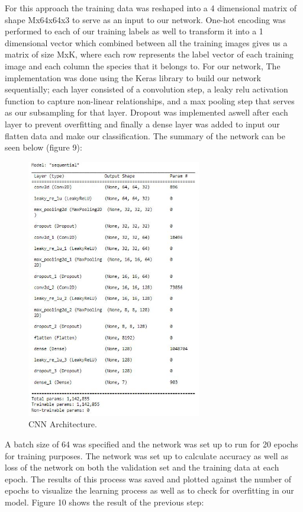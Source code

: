 \documentclass[11pt]{article}
\begin{document}
\begin{singlespace}
For this approach the training data was reshaped into a 4 dimensional matrix of shape Mx64x64x3 to serve as an input to our network. One-hot encoding was performed to each of our training labels as well to transform it into a 1 dimensional vector which combined between all the training images gives us a matrix of size MxK, where each row represents the label vector of each training image and each column the species that it belongs to. For our network, The implementation was done using the Keras library to build our network sequentially; each layer consisted of a convolution step, a leaky relu activation function to capture non-linear relationships, and a max pooling step that serves as our subsampling for that layer. Dropout was implemented aswell after each layer to prevent overfitting and finally a dense layer was added to input our flatten data and make our classification. The summary of the network can be seen below (figure 9): 

\pagebreak

\begin{figure}[h]
    \centering
    \includegraphics[width=0.68\textwidth]{plots/CNN-structure.jpg}
    \caption{CNN Architecture.}
\end{figure} 

\bigskip
\bigskip

A batch size of 64 was specified and the network was set up to run for 20 epochs for training purposes. The network was set up to calculate accuracy as well as loss of the network on both the validation set and the training data at each epoch. The results of this process was saved and plotted against the number of epochs to visualize the learning process as well as to check for overfitting in our model. Figure 10 shows the result of the previous step: \\


\end{singlespace}
\end{document}
